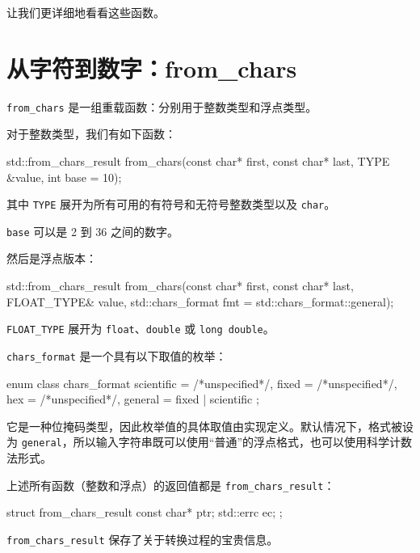 让我们更详细地看看这些函数。

\section{从字符到数字：from\_chars}

\texttt{from\_chars} 是一组重载函数：分别用于整数类型和浮点类型。

对于整数类型，我们有如下函数：

\begin{codebox}[cpp]
std::from_chars_result from_chars(const char* first,
                                  const char* last,
                                  TYPE &value,
                                  int base = 10);
\end{codebox}

其中 \texttt{TYPE} 展开为所有可用的有符号和无符号整数类型以及 \texttt{char}。

\texttt{base} 可以是 2 到 36 之间的数字。

然后是浮点版本：

\begin{codebox}[cpp]
std::from_chars_result from_chars(const char* first,
                                  const char* last,
                                  FLOAT_TYPE& value,
                                  std::chars_format fmt = std::chars_format::general);
\end{codebox}

\texttt{FLOAT\_TYPE} 展开为 \texttt{float}、\texttt{double} 或 \texttt{long double}。

\texttt{chars\_format} 是一个具有以下取值的枚举：

\begin{codebox}[cpp]
enum class chars_format {
    scientific = /*unspecified*/,
    fixed = /*unspecified*/,
    hex = /*unspecified*/,
    general = fixed | scientific
};
\end{codebox}

它是一种位掩码类型，因此枚举值的具体取值由实现定义。默认情况下，格式被设为 \texttt{general}，所以输入字符串既可以使用“普通”的浮点格式，也可以使用科学计数法形式。

上述所有函数（整数和浮点）的返回值都是 \texttt{from\_chars\_result}：

\begin{codebox}[cpp]
struct from_chars_result {
    const char* ptr;
    std::errc ec;
};
\end{codebox}

\texttt{from\_chars\_result} 保存了关于转换过程的宝贵信息。

